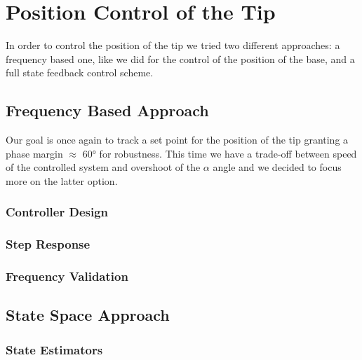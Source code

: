 \chapter{Position Control of the Tip}
\label{cha:position_tip}

    In order to control the position of the tip we tried two different approaches: a frequency based one, like we did for the control of the position of the base, and a full state feedback control scheme.

    \section{Frequency Based Approach}

        Our goal is once again to track a set point for the position of the tip granting a phase margin $\approx$ 60° for robustness. This time we have a trade-off between speed of the controlled system and overshoot of the $\alpha$ angle and we decided to focus more on the latter option.

        \subsection{Controller Design}


        \subsection{Step Response}


        \subsection{Frequency Validation}


    \section{State Space Approach}

    
        \subsection{State Estimators}

